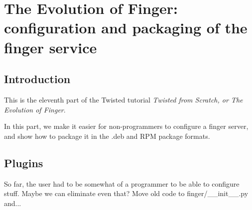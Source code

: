 \section{The Evolution of Finger: configuration and packaging of the finger service\label{doc/howto/tutorial/configuration.xhtml}}


\subsection{Introduction}


 This is the eleventh part of the Twisted tutorial \textit{Twisted from Scratch, or The Evolution of Finger}.

In this part, we make it easier for non-programmers to configure a finger server, and show how to package it in the .deb and RPM package formats.

\subsection{Plugins}


So far, the user had to be somewhat of a programmer to be able to configure stuff. Maybe we can eliminate even that? Move old code to finger/\_\_init\_\_.py and...

